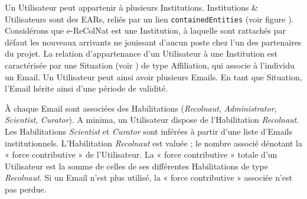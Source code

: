 \startchapter[title={Le modèle d'habilitations}]

\startsection[title={Les Emails}]

Un Utilisateur peut appartenir à plusieurs Institutions.
Institutions & Utilisateurs sont des EARs, reliés par un lien {\tt containedEntities} (voir figure ).
Considérons que e-ReColNat est une Institution, à laquelle sont rattachés par défaut les nouveaux arrivants ne jouissant d'aucun poste chez l'un des partenaires du projet.
La relation d'appartenance d'un Utilisateur à une Institution est caractérisée par une Situation (voir ) de type Affiliation, qui associe à l'individu un Email.
Un Utilisateur peut ainsi avoir plusieurs Emails.
En tant que Situation, l'Email hérite ainsi d'une période de validité.

\stopsection
\startsection[title={Les Habilitations}]

À chaque Email sont associées des Habilitations ({\it Recolnaut}, {\it Administrator}, {\it Scientist}, {\it Curator}).
A minima, un Utilisateur dispose de l'Habilitation {\it Recolnaut}.
Les Habilitations {\it Scientist} et {\it Curator} sont inférées à partir d'une liste d'Emails institutionnels.
L'Habilitation {\it Recolnaut} est valuée ; le nombre associé dénotant la « force contributive » de l'Utilisateur.
La « force contributive » totale d'un Utilisateur est la somme de celles de ses différentes Habilitations de type {\it Recolnaut}.
Si un Email n'est plus utilisé, la « force contributive » associée n'est pas perdue.


\stopsection
\stopchapter